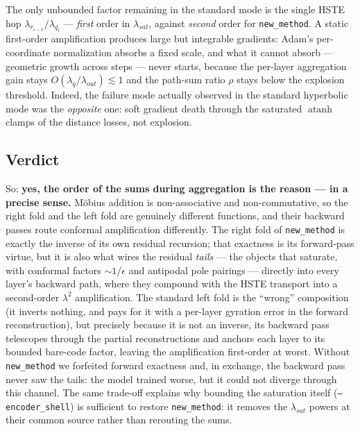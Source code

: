\documentclass{article}
\begin{document}
The only unbounded factor remaining in the standard mode is the single HSTE hop $\lambda_{r_{i-1}}/\lambda_{q_i}$ --- \emph{first} order in $\lambda_{sat}$, against \emph{second} order for \texttt{new\_method}. A static first-order amplification produces large but integrable gradients: Adam's per-coordinate normalization absorbs a fixed scale, and what it cannot absorb --- geometric growth across steps --- never starts, because the per-layer aggregation gain stays $O(\lambda_q/\lambda_{out}) \lesssim 1$ and the path-sum ratio $\rho$ stays below the explosion threshold. Indeed, the failure mode actually observed in the standard hyperbolic mode was the \emph{opposite} one: soft gradient death through the saturated $\operatorname{atanh}$ clamps of the distance losses, not explosion.

\subsection*{Verdict}
So: \textbf{yes, the order of the sums during aggregation is the reason --- in a precise sense.} M\"obius addition is non-associative and non-commutative, so the right fold and the left fold are genuinely different functions, and their backward passes route conformal amplification differently. The right fold of \texttt{new\_method} is exactly the inverse of its own residual recursion; that exactness is its forward-pass virtue, but it is also what wires the residual \emph{tails} --- the objects that saturate, with conformal factors $\sim 1/\epsilon$ and antipodal pole pairings --- directly into every layer's backward path, where they compound with the HSTE transport into a second-order $\lambda^2$ amplification. The standard left fold is the ``wrong'' composition (it inverts nothing, and pays for it with a per-layer gyration error in the forward reconstruction), but precisely because it is not an inverse, its backward pass telescopes through the partial reconstructions and anchors each layer to its bounded bare-code factor, leaving the amplification first-order at worst. Without \texttt{new\_method} we forfeited forward exactness and, in exchange, the backward pass never saw the tails: the model trained worse, but it could not diverge through this channel. The same trade-off explains why bounding the saturation itself (\texttt{--encoder\_shell}) is sufficient to restore \texttt{new\_method}: it removes the $\lambda_{sat}$ powers at their common source rather than rerouting the sums.
\end{document}
